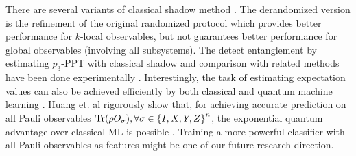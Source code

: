 \documentclass[
aps,
pra,
twocolumn,
floatfix,
]{revtex4-2}
\theoremstyle{plain}
\theoremstyle{definition}
\newcommand{\ob}{O}
\newcommand{\pob}{O}
\newcommand{\dm}{\rho}
\begin{document}

There are several variants of classical shadow method \cite{huangEfficientEstimationPauli2021} \cite{chenRobustShadowEstimation2021}.
The derandomized version is the refinement of the original randomized protocol which provides better performance for $k$-local observables, 
but not guarantees better performance for global observables (involving all subsystems).  
The detect entanglement by estimating $p_3$-PPT with classical shadow and comparison with related methods have been done experimentally \cite{elbenMixedstateEntanglementLocal2020} \cite{zhangExperimentalQuantumState2021}.
Interestingly, the task of estimating expectation values can also be achieved efficiently by both classical \cite{gaoEfficientRepresentationQuantum2017} \cite{torlaiManybodyQuantumState2018} \cite{zhuFlexibleLearningQuantum2022} and quantum machine learning \cite{huangPowerDataQuantum2021} \cite{huangProvablyEfficientMachine2022}.
Huang et. al rigorously show that, 
for achieving accurate prediction on all Pauli observables $\Tr(\dm\pob_{\sigma} ), \forall \sigma \in \qty{ I, X, Y, Z }^n$, the exponential quantum advantage over classical ML is possible
\cite{huangInformationtheoreticBoundsQuantum2021}.
Training a more powerful classifier with all Pauli observables as features might be one of our future research direction.
\end{document}
